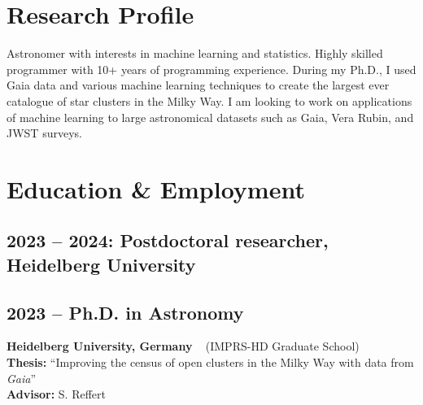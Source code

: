 \documentclass[12pt, letterpaper]{hunt-cv}
\begin{document}
\thispagestyle{plain}  %

\cvTitle

\section*{Research Profile}

Astronomer with interests in machine learning and statistics. Highly skilled programmer with 10+ years of programming experience. During my Ph.D., I used Gaia data and various machine learning techniques to create the largest ever catalogue of star clusters in the Milky Way. I am looking to work on applications of machine learning to large astronomical datasets such as Gaia, Vera Rubin, and JWST surveys.






\section*{Education \& Employment}

\subsection*{2023 -- 2024: Postdoctoral researcher, Heidelberg University}\vspace{0.3cm}

\subsection*{2023 -- Ph.D. in Astronomy}
\begin{addmargin}[1em]{0em}
    \textbf{Heidelberg University, Germany} ~ (IMPRS-HD Graduate School)\\
    \textbf{Thesis:} ``Improving the census of open clusters in the Milky Way with data from \emph{Gaia}''\\
    \textbf{Advisor:} S. Reffert
\end{addmargin}
\end{document}
